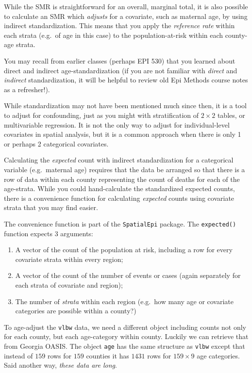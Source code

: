 \documentclass[
]{book}
\providecommand{\tightlist}{%
  \setlength{\itemsep}{0pt}\setlength{\parskip}{0pt}}
\begin{document}
While the SMR is straightforward for an overall, marginal total, it is also possible to calculate an SMR which \emph{adjusts} for a covariate, such as maternal age, by using indirect standardization. This means that you apply the \emph{reference rate} within each strata (e.g.~of age in this case) to the population-at-risk within each county-age strata.

You may recall from earlier classes (perhaps EPI 530) that you learned about direct and indirect age-standardization (if you are not familiar with \emph{direct} and \emph{indirect} standardization, it will be helpful to review old Epi Methods course notes as a refresher!).

While standardization may not have been mentioned much since then, it is a tool to adjust for confounding, just as you might with stratification of \(2\times 2\) tables, or multivariable regression. It is not the only way to adjust for individual-level covariates in spatial analysis, but it is a common approach when there is only 1 or perhaps 2 categorical covariates.

Calculating the \emph{expected} count with indirect standardization for a categorical variable (e.g.~maternal age) requires that the data be arranged so that there is a row of data within each county representing the count of deaths for each of the age-strata. While you could hand-calculate the standardized expected counts, there is a convenience function for calculating \emph{expected} counts using covariate strata that you may find easier.

The convenience function is part of the \texttt{SpatialEpi} package. The \texttt{expected()} function expects 3 arguments:

\begin{enumerate}
\def\labelenumi{\arabic{enumi}.}
\tightlist
\item
  A vector of the count of the population at risk, including a row for every covariate strata within every region;
\item
  A vector of the count of the number of events or cases (again separately for each strata of covariate and region);
\item
  The number of \emph{strata} within each region (e.g.~how many age or covariate categories are possible within a county?)
\end{enumerate}

To age-adjust the \texttt{vlbw} data, we need a different object including counts not only for each county, but each age-category within county. Luckily we can retrieve that from Georgia OASIS. The object \texttt{age} has the same structure as \texttt{vlbw} except that instead of \(159\) rows for \(159\) counties it has \(1431\) rows for \(159\times 9\) age categories. Said another way, \emph{these data are long}.
\end{document}
